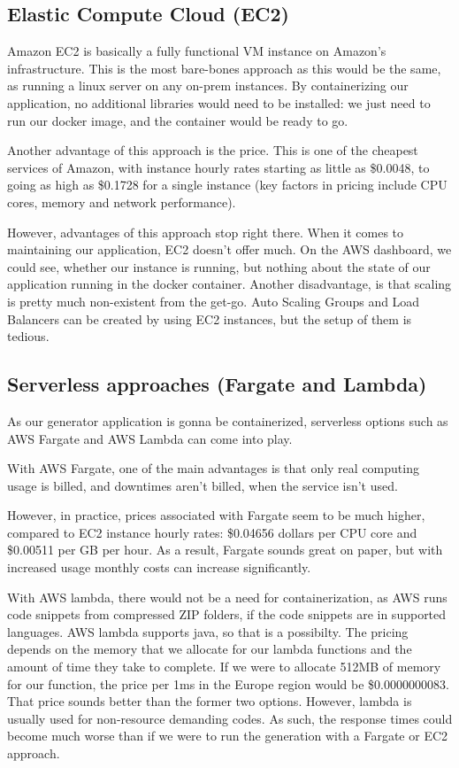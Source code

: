 	\subsection{Elastic Compute Cloud (EC2)}
		Amazon EC2 is basically a fully functional VM instance on Amazon's infrastructure. This is the most bare-bones approach as this
		would be the same, as running a linux server on any on-prem instances. 
		By containerizing our application, no additional libraries
		would need to be installed: we just need to run our docker image, and the container would be ready to go. 
		
		Another advantage of this approach
		is the price. This is one of the cheapest services of Amazon, with instance hourly rates starting as little as \$0.0048, to going as high as 
		\$0.1728 for a single instance (key factors in pricing include CPU cores, memory and network performance).

		However, advantages of this approach stop right there. When it comes to maintaining our application, EC2 doesn't offer much.
		On the AWS dashboard, we could see, whether our instance is running, but nothing about the state of our application running in 
		the docker container. Another disadvantage, is that scaling is pretty much non-existent from the get-go. Auto Scaling Groups and Load Balancers
		can be created by using EC2 instances, but the setup of them is tedious. 

	\subsection{Serverless approaches (Fargate and Lambda)}
		As our generator application is gonna be containerized, serverless options such as AWS Fargate and AWS Lambda can come into play.
		
		With AWS Fargate, one of the main advantages is that only real computing usage is billed, and
		downtimes aren't billed, when the service isn't used. 

		However, in practice, prices associated with Fargate seem to be 
		much higher, compared to EC2 instance hourly rates: \$0.04656 dollars per CPU core and \$0.00511 per GB per hour. As a
		result, Fargate sounds great on paper, but with increased usage monthly costs can increase significantly.

		With AWS lambda, there would not be a need for containerization, as AWS runs code snippets from compressed ZIP folders, if the code 
		snippets are in supported languages. AWS lambda supports java, so that is a possibilty. The pricing depends on the memory that 
		we allocate for our lambda functions and the amount of time they take to complete. If we were to allocate 512MB of memory for 
		our function, the price per 1ms in the Europe region would be \$0.0000000083. That price sounds better than the former two options. 
		However, lambda is usually used for non-resource demanding codes. As such, the response times could become much worse than if we 
		were to run the generation with a Fargate or EC2 approach.

